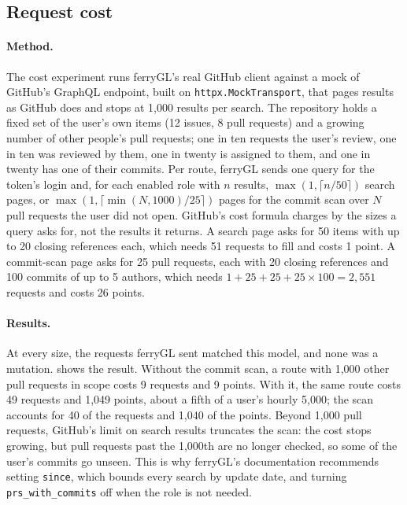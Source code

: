 \documentclass[11pt,a4paper]{article}
\newcommand{\ferry}{ferryGL}
\newcommand{\code}[1]{\texttt{#1}}
\begin{document}
\subsection{Request cost}
\label{sec:eval-cost}

\paragraph{Method.} The cost experiment runs \ferry's real GitHub client against a mock of
GitHub's GraphQL endpoint, built on \code{httpx.MockTransport}, that pages results as GitHub
does and stops at 1,000 results per search. The repository holds a fixed set of the user's own
items (12 issues, 8 pull requests) and a growing number of other people's pull requests; one in
ten requests the user's review, one in ten was reviewed by them, one in twenty is assigned to
them, and one in twenty has one of their commits. Per route, \ferry{} sends one query for the
token's login and, for each enabled role with $n$ results, $\max(1, \lceil n/50 \rceil)$
search pages, or $\max(1, \lceil \min(N, 1000)/25 \rceil)$ pages for the commit scan over $N$
pull requests the user did not open. GitHub's cost formula \cite{github2026graphqlratelimits}
charges by the sizes a query asks for, not the results it returns. A search page asks for 50
items with up to 20 closing references each, which needs 51 requests to fill and costs 1 point.
A commit-scan page asks for 25 pull requests, each with 20 closing references and 100 commits of
up to 5 authors, which needs $1 + 25 + 25 + 25 \times 100 = 2{,}551$ requests and costs 26
points.

\paragraph{Results.} At every size, the requests \ferry{} sent matched this model, and none was
a mutation.  shows the result. Without the commit scan, a route with 1,000 other
pull requests in scope costs 9 requests and 9 points. With it, the same route costs 49 requests
and 1,049 points, about a fifth of a user's hourly 5,000; the scan accounts for 40 of the
requests and 1,040 of the points. Beyond 1,000 pull requests, GitHub's limit on search results
truncates the scan: the cost stops growing, but pull requests past the 1,000th are no longer
checked, so some of the user's commits go unseen. This is why \ferry's documentation recommends
setting \code{since}, which bounds every search by update date, and turning
\code{prs\_with\_commits} off when the role is not needed.
\end{document}
